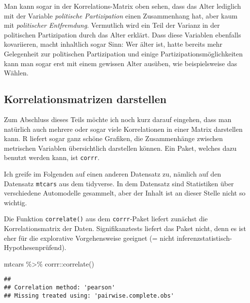 \documentclass[
]{book}
\newenvironment{Shaded}{\begin{snugshade}}{\end{snugshade}}
\newcommand{\FunctionTok}[1]{\textcolor[rgb]{0.00,0.00,0.00}{#1}}
\newcommand{\NormalTok}[1]{#1}
\newcommand{\SpecialCharTok}[1]{\textcolor[rgb]{0.00,0.00,0.00}{#1}}
\begin{document}
Man kann sogar in der Korrelations-Matrix oben sehen, dass das Alter lediglich mit der Variable \emph{politische Partizipation} einen Zusammenhang hat, aber kaum mit \emph{politischer Entfremdung}. Vermutlich wird ein Teil der Varianz in der politischen Partizipation durch das Alter erklärt. Dass diese Variablen ebenfalls kovariieren, macht inhaltlich sogar Sinn: Wer älter ist, hatte bereits mehr Gelegenheit zur politischen Partizipation und einige Partizipationsmöglichkeiten kann man sogar erst mit einem gewissen Alter ausüben, wie beispielsweise das Wählen.

\hypertarget{korrelationsmatrizen-darstellen}{%
\subsection{Korrelationsmatrizen darstellen}\label{korrelationsmatrizen-darstellen}}

Zum Abschluss dieses Teils möchte ich noch kurz darauf eingehen, dass man natürlich auch mehrere oder sogar viele Korrelationen in einer Matrix darstellen kann. R liefert sogar ganz schöne Grafiken, die Zusammenhänge zwischen metrischen Variablen übersichtlich darstellen können. Ein Paket, welches dazu benutzt werden kann, ist \texttt{corrr}.

Ich greife im Folgenden auf einen anderen Datensatz zu, nämlich auf den Datensatz \texttt{mtcars} aus dem tidyverse. In dem Datensatz sind Statistiken über verschiedene Automodelle gesammelt, aber der Inhalt ist an dieser Stelle nicht so wichtig.

Die Funktion \texttt{correlate()} aus dem \texttt{corrr}-Paket liefert zunächst die Korrelationsmatrix der Daten. Signifikanztests liefert das Paket nicht, denn es ist eher für die explorative Vorgehensweise geeignet (= nicht inferenzstatistisch-Hypothesenprüfend).

\begin{Shaded}
\begin{Highlighting}[]
\NormalTok{mtcars }\SpecialCharTok{\%\textgreater{}\%} 
\NormalTok{  corrr}\SpecialCharTok{::}\FunctionTok{correlate}\NormalTok{() }
\end{Highlighting}
\end{Shaded}

\begin{verbatim}
## 
## Correlation method: 'pearson'
## Missing treated using: 'pairwise.complete.obs'
\end{verbatim}
\end{document}
